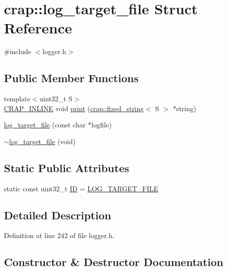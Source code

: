 \hypertarget{structcrap_1_1log__target__file}{}\section{crap\+:\+:log\+\_\+target\+\_\+file Struct Reference}
\label{structcrap_1_1log__target__file}


{\ttfamily \#include $<$logger.\+h$>$}

\subsection*{Public Member Functions}
\begin{DoxyCompactItemize}
\item 
{\footnotesize template$<$uint32\+\_\+t S$>$ }\\\hyperlink{config__x86_8h_a5a40526b8d842e7ff731509998bb0f1c}{C\+R\+A\+P\+\_\+\+I\+N\+L\+I\+N\+E} void \hyperlink{structcrap_1_1log__target__file_ab553b7699a39201299d55fcc33ce7f39}{print} (\hyperlink{classcrap_1_1fixed__string}{crap\+::fixed\+\_\+string}$<$ S $>$ $\ast$string)
\item 
\hyperlink{structcrap_1_1log__target__file_aa70a9e95eeecffe90641c999a9fd83dd}{log\+\_\+target\+\_\+file} (const char $\ast$logfile)
\item 
\hyperlink{structcrap_1_1log__target__file_a6169a101af6d3dfa3ea5cf15198cad5d}{$\sim$log\+\_\+target\+\_\+file} (void)
\end{DoxyCompactItemize}
\subsection*{Static Public Attributes}
\begin{DoxyCompactItemize}
\item 
static const uint32\+\_\+t \hyperlink{structcrap_1_1log__target__file_acf3fecd666f8318bbd09d33ca0531803}{I\+D} = \hyperlink{logger_8h_a15b53599af6891ab8add65cc94e2acb7}{L\+O\+G\+\_\+\+T\+A\+R\+G\+E\+T\+\_\+\+F\+I\+L\+E}
\end{DoxyCompactItemize}


\subsection{Detailed Description}


Definition at line 242 of file logger.\+h.



\subsection{Constructor \& Destructor Documentation}
\hypertarget{structcrap_1_1log__target__file_aa70a9e95eeecffe90641c999a9fd83dd}{}
